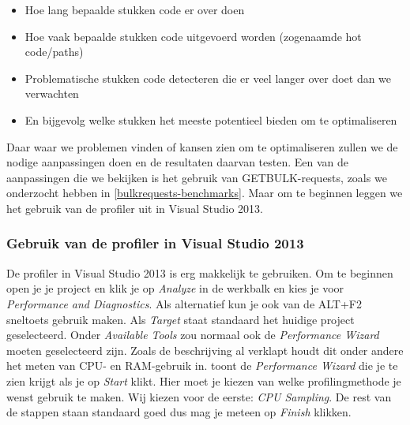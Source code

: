 \begin{itemize}
	\item Hoe lang bepaalde stukken code er over doen
	\item Hoe vaak bepaalde stukken code uitgevoerd worden (zogenaamde hot code/paths)
	\item Problematische stukken code detecteren die er veel langer over doet dan we verwachten
	\item En bijgevolg welke stukken het meeste potentieel bieden om te optimaliseren
\end{itemize}

Daar waar we problemen vinden of kansen zien om te optimaliseren zullen we de nodige aanpassingen doen en de resultaten daarvan testen.
Een van de aanpassingen die we bekijken is het gebruik van GETBULK-requests, zoals we onderzocht hebben in \cref{bulkrequests-benchmarks}.
Maar om te beginnen leggen we het gebruik van de profiler uit in Visual Studio 2013.

\subsubsection{Gebruik van de profiler in Visual Studio 2013}

De profiler in Visual Studio 2013 is erg makkelijk te gebruiken.
Om te beginnen open je je project en klik je op \emph{Analyze} in de werkbalk en kies je voor \emph{Performance and Diagnostics}.
Als alternatief kun je ook van de ALT+F2 sneltoets gebruik maken. %
Als \emph{Target} staat standaard het huidige project geselecteerd.
Onder \emph{Available Tools} zou normaal ook de \emph{Performance Wizard} moeten geselecteerd zijn.
Zoals de beschrijving al verklapt houdt dit onder andere het meten van CPU- en RAM-gebruik in.
 toont de \emph{Performance Wizard} die je te zien krijgt als je op \emph{Start} klikt.
Hier moet je kiezen van welke profilingmethode je wenst gebruik te maken.
Wij kiezen voor de eerste: \emph{CPU Sampling}.
De rest van de stappen staan standaard goed dus mag je meteen op \emph{Finish} klikken.

